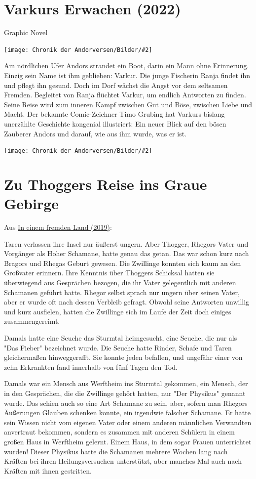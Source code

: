 \documentclass[10pt, a4paper, oneside]{book}
\newcommand{\fillbreak}{\vspace*{\fill}\columnbreak}
\newcommand{\produkt}[1]{%
    \section{#1}%
    \label{Produkt: #1}%
}
\newcommand{\refstorytext}[1]{\hyperref[Storytext: #1]{#1}}
\newcommand{\bildmitts}[2][height=0.32\textwidth,width=0.48\textwidth,keepaspectratio]{%
    \begin{center}
        \texttt{[image: Chronik der Andorversen/Bilder/\#2]}
    \end{center}
}
\begin{document}
\begin{multicols}{2}
\fillbreak
\produkt{Varkurs Erwachen (2022)}

\begin{center}
    Graphic Novel
\end{center}

\bildmitts{Varkurs Erwachen (2022)}

Am nördlichen Ufer Andors strandet ein Boot, darin ein Mann ohne Erinnerung. Einzig sein Name ist ihm geblieben: Varkur. Die junge Fischerin Ranja findet ihn und pflegt ihn gesund. Doch im Dorf wächst die Angst vor dem seltsamen Fremden. Begleitet von Ranja flüchtet Varkur, um endlich Antworten zu finden. Seine Reise wird zum inneren Kampf zwischen Gut und Böse, zwischen Liebe und Macht. Der bekannte Comic-Zeichner Timo Grubing hat Varkurs bislang unerzählte Geschichte kongenial illustriert: Ein neuer Blick auf den bösen Zauberer Andors und darauf, wie aus ihm wurde, was er ist.

\bildmitts{Varkurs Erwachen Mächte des Meeres.jpg}



\fillbreak
\section{Zu Thoggers Reise ins Graue Gebirge}


\begin{center}
    Aus \refstorytext{In einem fremden Land (2019)}:
\end{center}


Taren verlassen ihre Insel nur äußerst ungern. Aber Thogger, Rhegors Vater und Vorgänger als Hoher Schamane, hatte genau das getan. Das war schon kurz nach Bragors und Rhegas Geburt gewesen. Die Zwillinge konnten sich kaum an den Großvater erinnern. Ihre Kenntnis über Thoggers Schicksal hatten sie überwiegend aus Gesprächen bezogen, die ihr Vater gelegentlich mit anderen Schamanen geführt hatte. Rhegor selbst sprach nur ungern über seinen Vater, aber er wurde oft nach dessen Verbleib gefragt. Obwohl seine Antworten unwillig und kurz ausfielen, hatten die Zwillinge sich im Laufe der Zeit doch einiges zusammengereimt. 

Damals hatte eine Seuche das Sturmtal heimgesucht, eine Seuche, die nur als "Das Fieber" bezeichnet wurde. Die Seuche hatte Rinder, Schafe und Taren gleichermaßen hinweggerafft. Sie konnte jeden befallen, und ungefähr einer von zehn Erkrankten fand innerhalb von fünf Tagen den Tod. 

Damals war ein Mensch aus Werftheim ins Sturmtal gekommen, ein Mensch, der in den Gesprächen, die die Zwillinge gehört hatten, nur "Der Physikus" genannt wurde. 
Das schien auch so eine Art Schamane zu sein, aber, sofern man Rhegors Äußerungen Glauben schenken konnte, ein irgendwie falscher Schamane. Er hatte sein Wissen nicht vom eigenen Vater oder einem anderen männlichen Verwandten anvertraut bekommen, sondern es zusammen mit anderen Schülern in einem großen Haus in Werftheim gelernt. Einem Haus, in dem sogar Frauen unterrichtet wurden! 
Dieser Physikus hatte die Schamanen mehrere Wochen lang nach Kräften bei ihren Heilungsversuchen unterstützt, aber manches Mal auch nach Kräften mit ihnen gestritten. 


\end{multicols}
\end{document}
